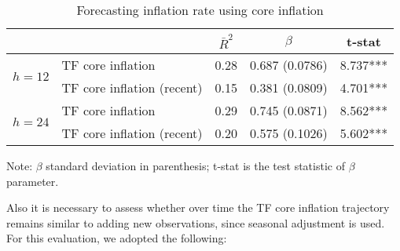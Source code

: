 \documentclass[10pt]{article}
\begin{document}
\vspace{0.3cm}

\begin{table}[h]
\centering
\caption{Forecasting inflation rate using core inflation}\label{infla_prev_toda_ipc}
\begin{threeparttable}
\begin{tabular}{@{}clccc@{}}
\toprule
                                   & \textbf{}                          & \textbf{$\bar{R}^2$} & \textbf{$\beta$} & \textbf{t-stat} \\ \midrule
\multirow{2}{*}{\textbf{$h = 12$}} & \multicolumn{1}{l|}{TF core inflation}           & 0.28   & 0.687 (0.0786)   & 8.737*** \\
                                   & \multicolumn{1}{l|}{TF core inflation (recent)}  & 0.15   & 0.381 (0.0809)   & 4.701*** \\ \midrule
\multirow{2}{*}{\textbf{$h = 24$}} & \multicolumn{1}{l|}{TF core inflation}           & 0.29   & 0.745 (0.0871)   & 8.562*** \\
                                   & \multicolumn{1}{l|}{TF core inflation (recent)}  & 0.20   & 0.575 (0.1026)   & 5.602*** \\ \bottomrule

\end{tabular}
\begin{tablenotes}
\item \scriptsize{Note: $\beta$ standard deviation in parenthesis; t-stat is the test statistic of $\beta$ parameter.}
\end{tablenotes}
\end{threeparttable}
\end{table}


\newpage

Also it is necessary to assess whether over time the TF core inflation trajectory remains similar to adding new observations, since seasonal adjustment is used. For this evaluation, we adopted the following:

\end{document}
